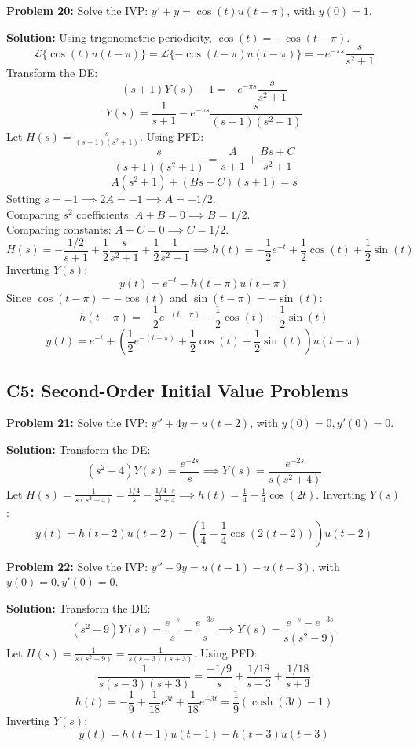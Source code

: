 \documentclass[11pt, letterpaper]{article}
\theoremstyle{definition}
\theoremstyle{remark}
\newcommand{\Lap}{\mathcal{L}}
\begin{document}
\vspace{1em}
\textbf{Problem 20:} Solve the IVP: $y' + y = \cos(t) u(t-\pi)$, with $y(0) = 1$.

\textbf{Solution:}
Using trigonometric periodicity, $\cos(t) = -\cos(t-\pi)$.
\[ \Lap\{\cos(t) u(t-\pi)\} = \Lap\{-\cos(t-\pi) u(t-\pi)\} = -e^{-\pi s} \frac{s}{s^2+1} \]
Transform the DE:
\[ (s+1)Y(s) - 1 = -e^{-\pi s} \frac{s}{s^2+1} \]
\[ Y(s) = \frac{1}{s+1} - e^{-\pi s} \frac{s}{(s+1)(s^2+1)} \]
Let $H(s) = \frac{s}{(s+1)(s^2+1)}$. Using PFD:
\[ \frac{s}{(s+1)(s^2+1)} = \frac{A}{s+1} + \frac{Bs+C}{s^2+1} \]
\[ A(s^2+1) + (Bs+C)(s+1) = s \]
Setting $s=-1 \implies 2A = -1 \implies A = -1/2$. \\
Comparing $s^2$ coefficients: $A + B = 0 \implies B = 1/2$. \\
Comparing constants: $A + C = 0 \implies C = 1/2$.
\[ H(s) = -\frac{1/2}{s+1} + \frac{1}{2} \frac{s}{s^2+1} + \frac{1}{2} \frac{1}{s^2+1} \implies h(t) = -\frac{1}{2}e^{-t} + \frac{1}{2}\cos(t) + \frac{1}{2}\sin(t) \]
Inverting $Y(s)$:
\[ y(t) = e^{-t} - h(t-\pi)u(t-\pi) \]
Since $\cos(t-\pi) = -\cos(t)$ and $\sin(t-\pi) = -\sin(t)$:
\[ h(t-\pi) = -\frac{1}{2}e^{-(t-\pi)} - \frac{1}{2}\cos(t) - \frac{1}{2}\sin(t) \]
\[ y(t) = e^{-t} + \left( \frac{1}{2}e^{-(t-\pi)} + \frac{1}{2}\cos(t) + \frac{1}{2}\sin(t) \right) u(t-\pi) \]

\subsection{C5: Second-Order Initial Value Problems}

\textbf{Problem 21:} Solve the IVP: $y'' + 4y = u(t-2)$, with $y(0) = 0, y'(0) = 0$.

\textbf{Solution:}
Transform the DE:
\[ (s^2+4)Y(s) = \frac{e^{-2s}}{s} \implies Y(s) = \frac{e^{-2s}}{s(s^2+4)} \]
Let $H(s) = \frac{1}{s(s^2+4)} = \frac{1/4}{s} - \frac{1/4 \cdot s}{s^2+4} \implies h(t) = \frac{1}{4} - \frac{1}{4}\cos(2t)$.
Inverting $Y(s)$:
\[ y(t) = h(t-2)u(t-2) = \left( \frac{1}{4} - \frac{1}{4}\cos(2(t-2)) \right) u(t-2) \]

\vspace{1em}
\textbf{Problem 22:} Solve the IVP: $y'' - 9y = u(t-1) - u(t-3)$, with $y(0) = 0, y'(0) = 0$.

\textbf{Solution:}
Transform the DE:
\[ (s^2-9)Y(s) = \frac{e^{-s}}{s} - \frac{e^{-3s}}{s} \implies Y(s) = \frac{e^{-s} - e^{-3s}}{s(s^2-9)} \]
Let $H(s) = \frac{1}{s(s^2-9)} = \frac{1}{s(s-3)(s+3)}$. Using PFD:
\[ \frac{1}{s(s-3)(s+3)} = \frac{-1/9}{s} + \frac{1/18}{s-3} + \frac{1/18}{s+3} \]
\[ h(t) = -\frac{1}{9} + \frac{1}{18}e^{3t} + \frac{1}{18}e^{-3t} = \frac{1}{9}(\cosh(3t) - 1) \]
Inverting $Y(s)$:
\[ y(t) = h(t-1)u(t-1) - h(t-3)u(t-3) \]
\end{document}
